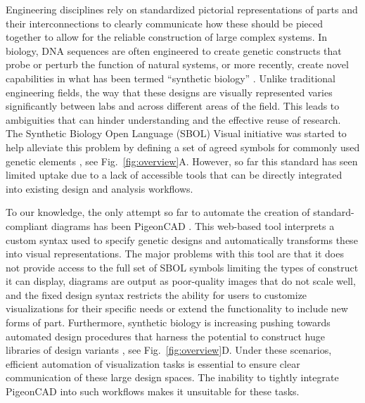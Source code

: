 \documentclass{bioinfo}
\begin{document}
Engineering disciplines rely on standardized pictorial representations of parts and their interconnections to clearly communicate how these should be pieced together to allow for the reliable construction of large complex systems. In biology, DNA sequences are often engineered to create genetic constructs that probe or perturb the function of natural systems, or more recently, create novel capabilities in what has been termed ``synthetic biology'' \citep{Church14a}. Unlike traditional engineering fields, the way that these designs are visually represented varies significantly between labs and across different areas of the field. This leads to ambiguities that can hinder understanding and the effective reuse of research. The Synthetic Biology Open Language (SBOL) Visual initiative was started to help alleviate this problem by defining a set of agreed symbols for commonly used genetic elements \citep{Quinn13a}, see Fig.~\ref{fig:overview}A. However, so far this standard has seen limited uptake due to a lack of accessible tools that can be directly integrated into existing design and analysis workflows.

To our knowledge, the only attempt so far to automate the creation of standard-compliant diagrams has been PigeonCAD \citep{Bhatia13a}. This web-based tool interprets a custom syntax used to specify genetic designs and automatically transforms these into visual representations. The major problems with this tool are that it does not provide access to the full set of SBOL symbols limiting the types of construct it can display, diagrams are output as poor-quality images that do not scale well, and the fixed design syntax restricts the ability for users to customize visualizations for their specific needs or extend the functionality to include new forms of part. Furthermore, synthetic biology is increasing pushing towards automated design procedures that harness the potential to construct huge libraries of design variants \citep{Smanski14a,Bilitchenko11a}, see Fig.~\ref{fig:overview}D. Under these scenarios, efficient automation of visualization tasks is essential to ensure clear communication of these large design spaces. The inability to tightly integrate PigeonCAD into such workflows makes it unsuitable for these tasks.
\end{document}
